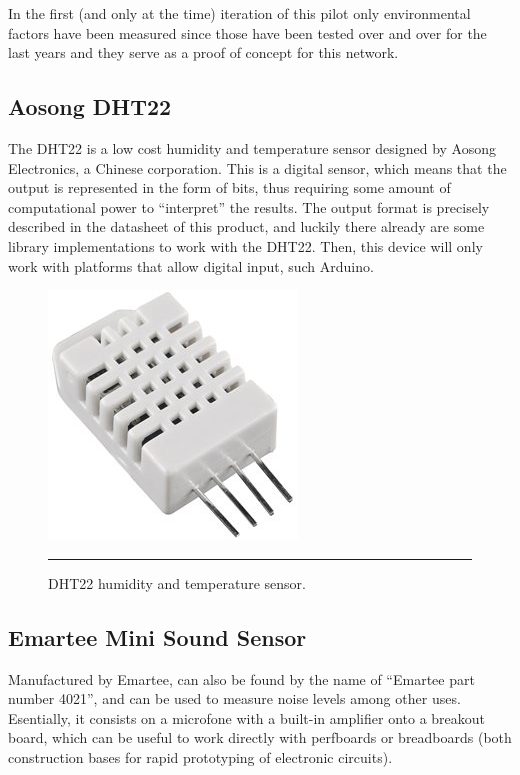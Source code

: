 In the first (and only at the time) iteration of this pilot only environmental factors have been measured since those have been tested over and over for the last years and they serve as a proof of concept for this network.

\subsection{Aosong DHT22\citep{dht22sensor}}

The DHT22 is a low cost humidity and temperature sensor designed by Aosong Electronics, a Chinese corporation. This is a digital sensor, which means that the output is represented in the form of bits, thus requiring some amount of computational power to ``interpret'' the results. The output format is precisely described in the datasheet of this product, and luckily there already are some library implementations to work with the DHT22. Then, this device will only work with platforms that allow digital input, such Arduino.

\begin{figure}[htbp]
    \centering
        \includegraphics[scale=0.8]{./Figures/dht22.jpg}
        \rule{35em}{0.5pt}
    \caption[DHT22 sensor]{DHT22 humidity and temperature sensor.}
    \label{fig:DHT22}
\end{figure}



\subsection{Emartee Mini Sound Sensor\citep{emarteeminisound}}

Manufactured by Emartee, can also be found by the name of ``Emartee part number 4021'', and can be used to measure noise levels among other uses. Esentially, it consists on a microfone with a built-in amplifier onto a breakout board, which can be useful to work directly with perfboards or breadboards (both construction bases for rapid prototyping of electronic circuits).

